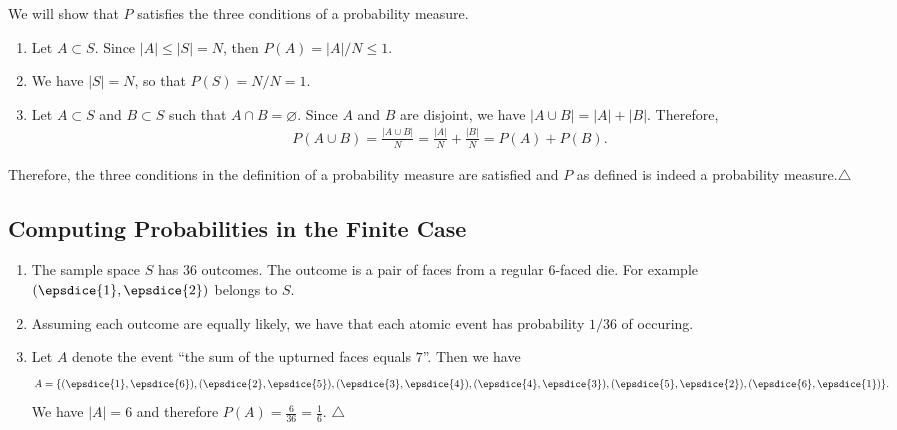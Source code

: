 	\begin{problem}
	We will show that $P$ satisfies the three conditions of a probability measure.
	\begin{enumerate}[label=\alph*)]
	\item Let $A \subset S$. Since $|A| \leq |S| = N$, then $P (A) = |A| / N \leq 1$.
	\item We have $|S| = N$, so that $P (S) = N / N = 1$.
	\item Let $A \subset S$ and $B \subset S$ such that $A \cap B = \varnothing$. Since $A$ and $B$ are disjoint, we have $|A \cup B| = |A| + |B|$. Therefore,
		\begin{align*}
		P (A \cup B) = \frac{|A \cup B|}{N} = \frac{|A|}{N} + \frac{|B|}{N} = P (A) + P (B) .
		\end{align*}
	\end{enumerate}
	Therefore, the three conditions in the definition of a probability measure are satisfied and $P$ as defined is indeed a probability measure.\hfill$\triangle$
	\end{problem}
	
	\subsection{Computing Probabilities in the Finite Case}
	
	\begin{problem}
	\begin{enumerate}[label=\Circled{\arabic*}]
	\item The sample space $S$ has $36$ outcomes. The outcome is a pair of faces from a regular $6$-faced die. For example $(\epsdice{1} , \epsdice{2})$ belongs to $S$.
	\item Assuming each outcome are equally likely, we have that each atomic event has probability $1/36$ of occuring.
	\item Let $A$ denote the event ``the sum of the upturned faces equals $7$''. Then we have
		\begin{align*}
		A = \{ (\epsdice{1} , \epsdice{6}) , (\epsdice{2} , \epsdice{5}) , (\epsdice{3} , \epsdice{4}) , (\epsdice{4} , \epsdice{3}) , (\epsdice{5} , \epsdice{2}) , (\epsdice{6} , \epsdice{1}) \} .
		\end{align*}
	We have $|A| = 6$ and therefore $P (A) = \frac{6}{36} = \frac{1}{6}$. \hfill $\triangle$
	\end{enumerate}
	\end{problem}
	
